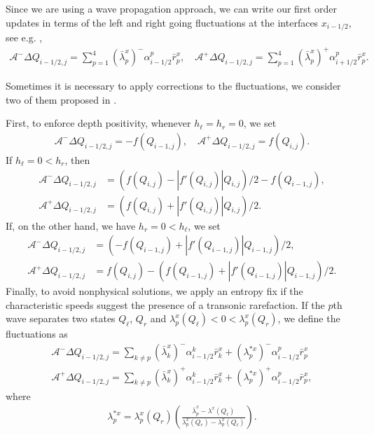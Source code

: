 \documentclass[12pt]{article}
\begin{document}
Since we are using a wave propagation approach, we can write our first order updates in terms of the left and right going fluctuations at the interfaces $x_{i-1/2}$, see e.g. \cite[Section 15.3]{leveque2002finite},
\begin{align}
    \mathcal{A}^{-}\Delta Q_{i-1/2,j}=\sum_{p=1}^4(\bar{\lambda}^x_p)^{-}\alpha^p_{i-1/2}\bar{r}^x_p, \quad
    \mathcal{A}^{+}\Delta Q_{i-1/2,j}=\sum_{p=1}^4(\bar{\lambda}^x_p)^{+}\alpha^p_{i+1/2}\bar{r}^x_p.
\end{align}

Sometimes it is necessary to apply corrections to the fluctuations, we consider two of them proposed in \cite{monthe1999positivity}.

First, to enforce depth positivity, whenever $h_\ell=h_r=0$,  we set 
\begin{align}
    \mathcal{A}^{-}\Delta Q_{i-1/2,j}=-f(Q_{i-1,j}),\quad \mathcal{A}^{+}\Delta Q_{i-1/2,j}=f(Q_{i,j}).
\end{align}
If $h_\ell=0<h_r$, then
\begin{align}
    \mathcal{A}^{-}\Delta Q_{i-1/2,j}&=(f(Q_{i,j})-|f'(Q_{i,j})|Q_{i,j})/2-f(Q_{i-1,j}),\\
    \mathcal{A}^{+}\Delta Q_{i-1/2,j}&=(f(Q_{i,j})+|f'(Q_{i,j})|Q_{i,j})/2.
\end{align}
If, on the other hand, we have $h_r=0<h_\ell$, we set
\begin{align}
    \mathcal{A}^{-}\Delta Q_{i-1/2,j}&=(-f(Q_{i-1,j})+|f'(Q_{i-1,j})|Q_{i-1,j})/2,\\
    \mathcal{A}^{+}\Delta Q_{i-1/2,j}&=f(Q_{i,j})-(f(Q_{i-1,j})+|f'(Q_{i-1,j})|Q_{i-1,j})/2.
\end{align}
Finally, to avoid nonphysical solutions, we apply an entropy fix if the characteristic speeds suggest the presence of a transonic rarefaction.
If the $p$th wave separates two states $Q_\ell$, $Q_r$ and $\lambda^x_p(Q_\ell)<0<\lambda^x_p(Q_r)$, we define the fluctuations as
\begin{align}
    \mathcal{A}^{-}\Delta Q_{i-1/2,j}=\sum_{k\neq p}(\bar{\lambda}^x_k)^{-}\alpha^k_{i-1/2}\bar{r}^x_k+(\lambda^{*x}_p)^{-}\alpha^p_{i-1/2}\bar{r}^x_p\\
    \mathcal{A}^{+}\Delta Q_{i-1/2,j}=\sum_{k\neq p}(\bar{\lambda}^x_k)^{+}\alpha^k_{i-1/2}\bar{r}^x_k+(\lambda^{*x}_p)^{+}\alpha^p_{i-1/2}\bar{r}^x_p,
\end{align}
where
\begin{align}
    \lambda^{*x}_p=\lambda^x_p(Q_r)\left(\frac{\bar{\lambda}^x_p-\lambda^x(Q_\ell)}{\lambda^x_p(Q_r)-\lambda^x_p(Q_\ell)}\right).
\end{align}
\end{document}

